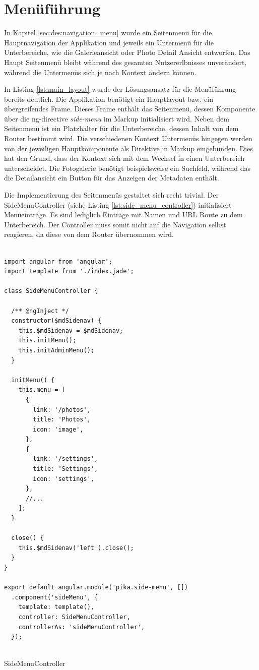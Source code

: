 \section{Menüführung}

In Kapitel \ref{sec:des:navigation_menu} wurde ein Seitenmenü für die Hauptnavigation der Applikation und jeweils ein Untermenü für die Unterbereiche, wie die Galerieansicht oder Photo Detail Ansicht entworfen. Das Haupt Seitenmenü bleibt während des gesamten Nutzererlbnisses unverändert, während die Untermenüs sich je nach Kontext ändern können.

In Listing \ref{lst:main_layout} wurde der Lösungsansatz für die Menüführung bereits deutlich. Die Applikation benötigt ein Hauptlayout bzw. ein übergreifendes Frame. Dieses Frame enthält das Seitenmenü, dessen Komponente über die \gls{ng-directive} \textit{side-menu} im Markup initialisiert wird. Neben dem Seitenmenü ist ein Platzhalter für die Unterbereiche, dessen Inhalt von dem Router bestimmt wird. Die verschiedenen Kontext Untermenüs hingegen werden von der jeweiligen Hauptkomponente als Direktive in Markup eingebunden. Dies hat den Grund, dass der Kontext sich mit dem Wechsel in einen Unterbereich unterscheidet. Die Fotogalerie benötigt beispielsweise ein Suchfeld, während das die Detailansicht ein Button für das Anzeigen der Metadaten enthält.

Die Implementierung des Seitenmenüs gestaltet sich recht trivial. Der SideMenuController (siehe Listing \ref{lst:side_menu_controller}) initialisiert Menüeinträge. Es sind lediglich Einträge mit Namen und URL Route zu dem Unterbereich. Der Controller muss somit nicht auf die Navigation selbst reagieren, da diese von dem Router übernommen wird.

\begin{listing}[H]
\begin{verbatim}

import angular from 'angular';
import template from './index.jade';

class SideMenuController {

  /** @ngInject */
  constructor($mdSidenav) {
    this.$mdSidenav = $mdSidenav;
    this.initMenu();
    this.initAdminMenu();
  }

  initMenu() {
    this.menu = [
      {
        link: '/photos',
        title: 'Photos',
        icon: 'image',
      },
      {
        link: '/settings',
        title: 'Settings',
        icon: 'settings',
      },
      //...
    ];
  }

  close() {
    this.$mdSidenav('left').close();
  }
}

export default angular.module('pika.side-menu', [])
  .component('sideMenu', {
    template: template(),
    controller: SideMenuController,
    controllerAs: 'sideMenuController',
  });


\end{verbatim}
\caption{SideMenuController}
\label{lst:side_menu_controller}
\end{listing}


